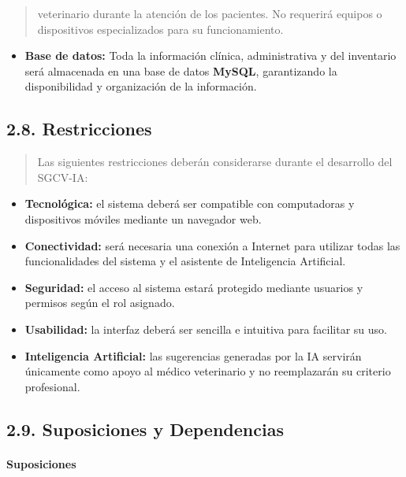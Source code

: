 \documentclass[
]{article}
\begin{document}
\begin{quote}
veterinario durante la atención de los pacientes. No requerirá equipos o
dispositivos especializados para su funcionamiento.
\end{quote}

\begin{itemize}
\item
  \textbf{Base de datos:} Toda la información clínica, administrativa y
  del inventario será almacenada en una base de datos \textbf{MySQL},
  garantizando la disponibilidad y organización de la información.
\end{itemize}

\subsection{2.8. Restricciones}\label{restricciones}

\begin{quote}
Las siguientes restricciones deberán considerarse durante el desarrollo
del SGCV-IA:
\end{quote}

\begin{itemize}
\item
  \textbf{Tecnológica:} el sistema deberá ser compatible con
  computadoras y dispositivos móviles mediante un navegador web.
\item
  \textbf{Conectividad:} será necesaria una conexión a Internet para
  utilizar todas las funcionalidades del sistema y el asistente de
  Inteligencia Artificial.
\item
  \textbf{Seguridad:} el acceso al sistema estará protegido mediante
  usuarios y permisos según el rol asignado.
\item
  \textbf{Usabilidad:} la interfaz deberá ser sencilla e intuitiva para
  facilitar su uso.
\item
  \textbf{Inteligencia Artificial:} las sugerencias generadas por la IA
  servirán únicamente como apoyo al médico veterinario y no reemplazarán
  su criterio profesional.
\end{itemize}

\subsection{2.9. Suposiciones y
Dependencias}\label{suposiciones-y-dependencias}

\paragraph{Suposiciones}\label{suposiciones}
\end{document}
